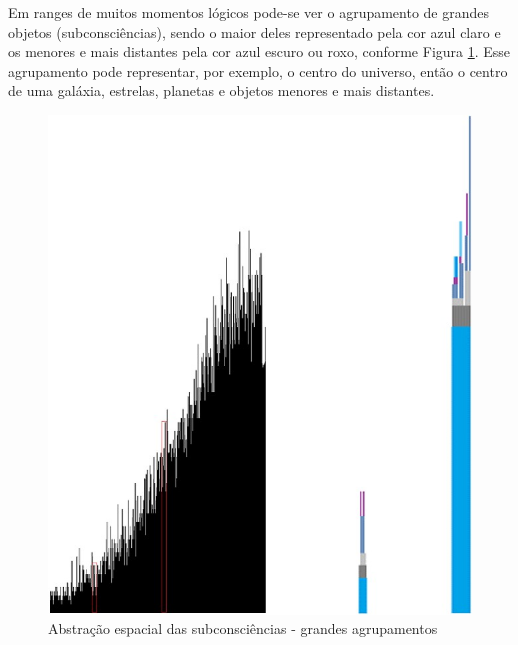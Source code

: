 Em ranges de muitos momentos lógicos pode-se ver o agrupamento de grandes objetos (subconsciências), sendo o maior deles representado pela cor azul claro e os menores e mais distantes pela cor azul escuro ou roxo, conforme Figura \ref{fig:consciousness_space_subconsciousness}. Esse agrupamento pode representar, por exemplo, o centro do universo, então o centro de uma galáxia, estrelas, planetas e objetos menores e mais distantes.
	\begin{figure}[H]
	\caption{Abstração espacial das subconsciências - grandes agrupamentos}
	\label{fig:consciousness_space_subconsciousness}
	\centering
	\includegraphics[scale=.5]{sections/images/consciousness_space_subconsciousness.jpg}
	\end{figure}

